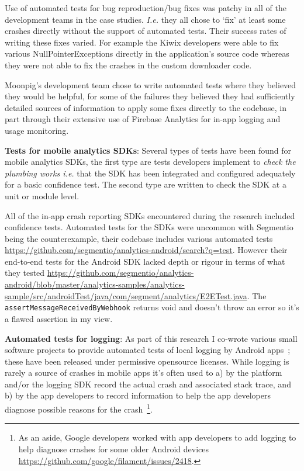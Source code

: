 Use of automated tests for bug reproduction/bug fixes was patchy in all of the development teams in the case studies. \emph{I.e.} they all chose to `fix' at least some crashes directly without the support of automated tests. Their success rates of writing these fixes varied. For example the Kiwix developers were able to fix various NullPointerExceptions directly in the application's source code whereas they were not able to fix the crashes in the custom downloader code. 

Moonpig's development team chose to write automated tests where they believed they would be helpful, for some of the failures they believed they had sufficiently detailed sources of information to apply some fixes directly to the codebase, in part through their extensive use of Firebase Analytics for in-app logging and usage monitoring.



\textbf{Tests for mobile analytics SDKs}: 
Several types of tests have been found for mobile analytics SDKs, the first type are tests developers implement to \textit{check the plumbing works i.e.} that the SDK has been integrated and configured adequately for a basic confidence test. The second type are written to check the SDK at a unit or module level.

All of the in-app crash reporting SDKs encountered during the research included confidence tests. Automated tests for the SDKs were uncommon with Segmentio being the counterexample, their codebase includes various automated tests \url{https://github.com/segmentio/analytics-android/search?q=test}. However their end-to-end tests for the Android SDK lacked depth or rigour in terms of what they tested \url{https://github.com/segmentio/analytics-android/blob/master/analytics-samples/analytics-sample/src/androidTest/java/com/segment/analytics/E2ETest.java}. The \texttt{assertMessageReceivedByWebhook} returns void and doesn't throw an error so it's a flawed assertion in my view.  

\textbf{Automated tests for logging}: 
As part of this research I co-wrote various small software projects to provide automated tests of local logging by Android apps~\citep{android_crash_dummy, android_log_assert}; these have been released under permissive opensource licenses. While logging is rarely a source of crashes in mobile apps it's often used to a) by the platform and/or the logging SDK record the actual crash and associated stack trace, and b) by the app developers to record information to help the app developers diagnose possible reasons for the crash~\footnote{As an aside, Google developers worked with app developers to add logging to help diagnose crashes for some older Android devices \url{https://github.com/google/filament/issues/2418}.}. 

